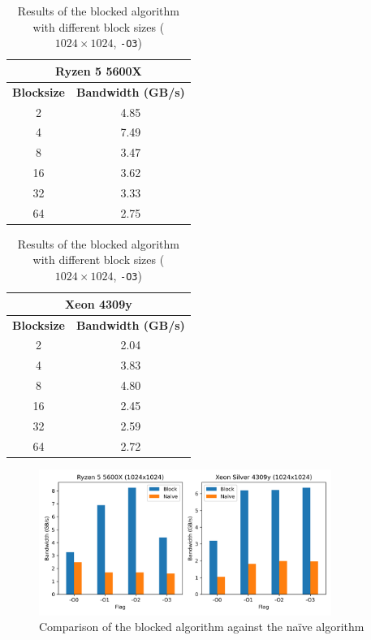 \documentclass{IEEEconf}
\begin{document}
\begin{table}[h]
    \centering
    \begin{tabular}{|c|c|}
        \hline
        \multicolumn{2}{|c|}{\textbf{Ryzen 5 5600X}} \\
        \hline
        \textbf{Blocksize } & \textbf{Bandwidth (GB/s)} \\ \hline
        2         & 4.85 \\ \hline
        \rowcolor{LightYellow}
        4         & 7.49 \\ \hline
        8         & 3.47 \\ \hline
        16        & 3.62 \\ \hline
        32        & 3.33 \\ \hline
        64        & 2.75 \\ \hline
    \end{tabular}
    \hspace{2em}
    \begin{tabular}{|c|c|}
        \hline
        \multicolumn{2}{|c|}{\textbf{Xeon 4309y}} \\
        \hline
        \textbf{Blocksize } & \textbf{Bandwidth (GB/s)} \\ \hline
        2         & 2.04 \\ \hline
        4         & 3.83 \\ \hline
        \rowcolor{LightYellow}
        8         & 4.80 \\ \hline
        16        & 2.45 \\ \hline
        32        & 2.59 \\ \hline
        64        & 2.72 \\ \hline
    \end{tabular}
    \caption{Results of the blocked algorithm with different block sizes ($1024 \times 1024$, \texttt{-O3})}
    \label{tab:blocked_results}
\end{table}
\begin{figure}
    \centering
    \includegraphics[width=0.85\textwidth]{report/img/block_vs_naive.png}
    \caption{Comparison of the blocked algorithm against the na\"{i}ve algorithm}
    \label{fig:blocked_comparison}
\end{figure}
\end{document}
